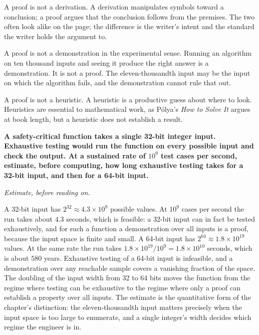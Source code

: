 A proof is not a derivation. A derivation manipulates symbols toward
a conclusion; a proof argues that the conclusion follows from the
premises. The two often look alike on the page; the difference is
the writer's intent and the standard the writer holds the argument
to.

A proof is not a demonstration in the experimental sense. Running an
algorithm on ten thousand inputs and seeing it produce the right
answer is a demonstration. It is not a proof. The eleven-thousandth
input may be the input on which the algorithm fails, and the
demonstration cannot rule that out.

A proof is not a heuristic. A heuristic is a productive guess about
where to look. Heuristics are essential to mathematical work, as
P\'{o}lya's \emph{How to Solve It} \cite{gen:polya1945} argues at
book length, but a heuristic does not establish a result.

\begin{estimation}
\textbf{A safety-critical function takes a single 32-bit integer
input. Exhaustive testing would run the function on every possible
input and check the output. At a sustained rate of $10^{9}$ test cases
per second, estimate, before computing, how long exhaustive testing
takes for a 32-bit input, and then for a 64-bit input.}

\smallskip
\textit{Estimate, before reading on.}

\smallskip
A 32-bit input has $2^{32} \approx 4.3 \times 10^{9}$ possible values.
At $10^{9}$ cases per second the run takes about $4.3$ seconds, which
is feasible: a 32-bit input can in fact be tested exhaustively, and
for such a function a demonstration over all inputs is a proof, because
the input space is finite and small. A 64-bit input has $2^{64}
\approx 1.8 \times 10^{19}$ values. At the same rate the run takes
$1.8 \times 10^{19} / 10^{9} = 1.8 \times 10^{10}$ seconds, which is
about $580$ years. Exhaustive testing of a 64-bit input is infeasible,
and a demonstration over any reachable sample covers a vanishing
fraction of the space. The doubling of the input width from 32 to 64
bits moves the function from the regime where testing can be exhaustive
to the regime where only a proof can establish a property over all
inputs. The estimate is the quantitative form of the chapter's
distinction: the eleven-thousandth input matters precisely when the
input space is too large to enumerate, and a single integer's width
decides which regime the engineer is in.
\end{estimation}

